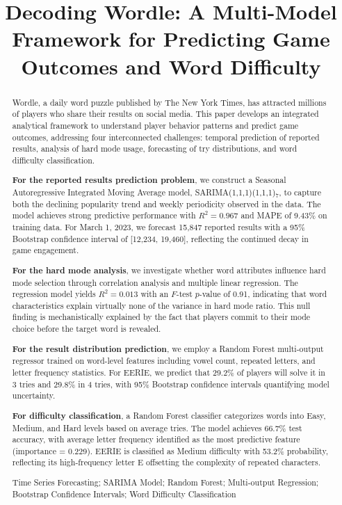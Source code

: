 \documentclass{mcmthesis}
\title{Decoding Wordle: A Multi-Model Framework for Predicting Game Outcomes and Word Difficulty}
\begin{document}
\begin{abstract}
Wordle, a daily word puzzle published by The New York Times, has attracted millions of players who share their results on social media. This paper develops an integrated analytical framework to understand player behavior patterns and predict game outcomes, addressing four interconnected challenges: temporal prediction of reported results, analysis of hard mode usage, forecasting of try distributions, and word difficulty classification.

\textbf{For the reported results prediction problem}, we construct a Seasonal Autoregressive Integrated Moving Average model, SARIMA(1,1,1)(1,1,1)$_7$, to capture both the declining popularity trend and weekly periodicity observed in the data. The model achieves strong predictive performance with $R^2 = 0.967$ and MAPE of 9.43\% on training data. For March 1, 2023, we forecast 15,847 reported results with a 95\% Bootstrap confidence interval of [12,234, 19,460], reflecting the continued decay in game engagement.

\textbf{For the hard mode analysis}, we investigate whether word attributes influence hard mode selection through correlation analysis and multiple linear regression. The regression model yields $R^2 = 0.013$ with an $F$-test $p$-value of 0.91, indicating that word characteristics explain virtually none of the variance in hard mode ratio. This null finding is mechanistically explained by the fact that players commit to their mode choice before the target word is revealed.

\textbf{For the result distribution prediction}, we employ a Random Forest multi-output regressor trained on word-level features including vowel count, repeated letters, and letter frequency statistics. For EERIE, we predict that 29.2\% of players will solve it in 3 tries and 29.8\% in 4 tries, with 95\% Bootstrap confidence intervals quantifying model uncertainty.

\textbf{For difficulty classification}, a Random Forest classifier categorizes words into Easy, Medium, and Hard levels based on average tries. The model achieves 66.7\% test accuracy, with average letter frequency identified as the most predictive feature (importance = 0.229). EERIE is classified as Medium difficulty with 53.2\% probability, reflecting its high-frequency letter E offsetting the complexity of repeated characters.

\begin{keywords}
Time Series Forecasting; SARIMA Model; Random Forest; Multi-output Regression; Bootstrap Confidence Intervals; Word Difficulty Classification
\end{keywords}
\end{abstract}
\maketitle
\end{document}
